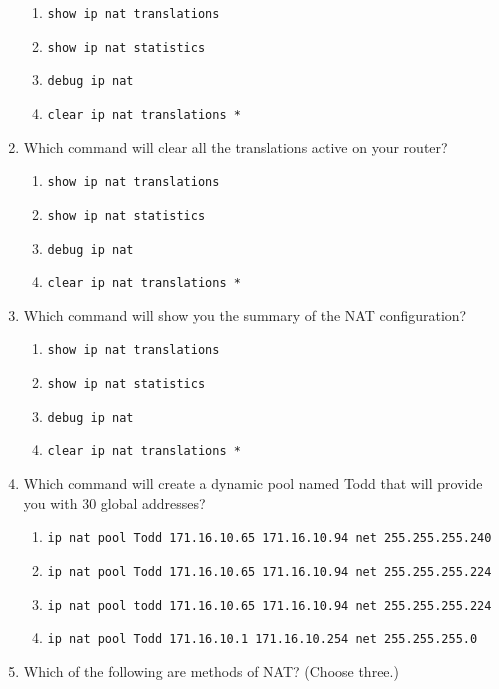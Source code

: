 \begin{enumerate}
  \begin{enumerate}
    \item
    \texttt{show\ ip\ nat\ translations}
  \item
    \texttt{show\ ip\ nat\ statistics}
  \item
    \texttt{debug\ ip\ nat}
  \item
    \texttt{clear\ ip\ nat\ translations\ *}
  \end{enumerate}
\item
  Which command will clear all the translations active on your router?

  \begin{enumerate}
    \item
    \texttt{show\ ip\ nat\ translations}
  \item
    \texttt{show\ ip\ nat\ statistics}
  \item
    \texttt{debug\ ip\ nat}
  \item
    \texttt{clear\ ip\ nat\ translations\ *}
  \end{enumerate}
\item
  Which command will show you the summary of the NAT configuration?

  \begin{enumerate}
    \item
    \texttt{show\ ip\ nat\ translations}
  \item
    \texttt{show\ ip\ nat\ statistics}
  \item
    \texttt{debug\ ip\ nat}
  \item
    \texttt{clear\ ip\ nat\ translations\ *}
  \end{enumerate}
\item
  Which command will create a dynamic pool named Todd that will provide
  you with 30 global addresses?

  \begin{enumerate}
    \item
    \texttt{ip\ nat\ pool\ Todd\ 171.16.10.65\ 171.16.10.94\ net\ 255.255.255.240}
  \item
    \texttt{ip\ nat\ pool\ Todd\ 171.16.10.65\ 171.16.10.94\ net\ 255.255.255.224}
  \item
    \texttt{ip\ nat\ pool\ todd\ 171.16.10.65\ 171.16.10.94\ net\ 255.255.255.224}
  \item
    \texttt{ip\ nat\ pool\ Todd\ 171.16.10.1\ 171.16.10.254\ net\ 255.255.255.0}
  \end{enumerate}
\item
  Which of the following are methods of NAT? (Choose three.)


\end{enumerate}
